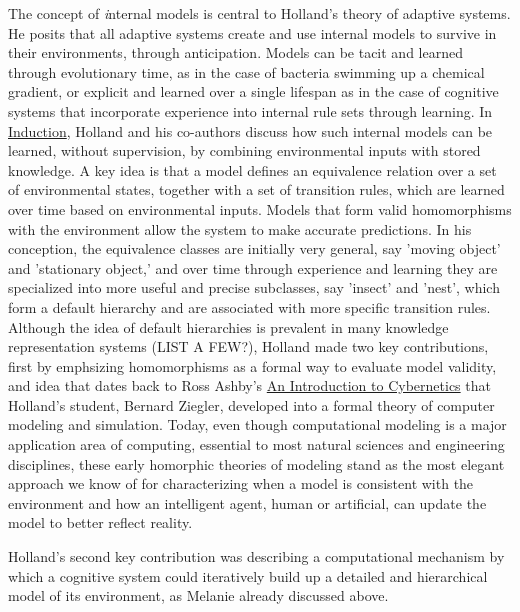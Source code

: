 \documentclass{sig-alternate}
\begin{document}
The concept of {\emph internal models} is central to Holland's theory
of adaptive systems.  He posits that all adaptive systems create and
use internal models to survive in their environments, through
anticipation.  Models can be tacit and learned through evolutionary
time, as in the case of bacteria swimming up a chemical gradient, or
explicit and learned over a single lifespan as in the case of
cognitive systems that incorporate experience into internal rule sets
through learning.  In \underline{Induction}, Holland and his
co-authors discuss how such internal models can be learned, without
supervision, by combining environmental inputs with stored knowledge.
A key idea is that a model defines an equivalence relation over a set
of environmental states, together with a set of transition rules,
which are learned over time based on environmental inputs.  Models
that form valid homomorphisms with the environment allow the system to
make accurate predictions.  In his conception, the equivalence classes
are initially very general, say 'moving object' and 'stationary
object,' and over time through experience and learning they are
specialized into more useful and precise subclasses, say 'insect' and
'nest', which form a default hierarchy and are associated with more
specific transition rules.  Although the idea of default hierarchies
is prevalent in many knowledge representation systems (LIST A FEW?),
Holland made two key contributions, first by emphsizing homomorphisms
as a formal way to evaluate model validity, and idea that dates back
to Ross Ashby's \underline{An Introduction to Cybernetics} that
Holland's student, Bernard Ziegler, developed into a formal theory of
computer modeling and simulation.  Today, even though computational
modeling is a major application area of computing, essential to most
natural sciences and engineering disciplines, these early homorphic
theories of modeling stand as the most elegant approach we know of for
characterizing when a model is consistent with the environment and how
an intelligent agent, human or artificial, can update the model to
better reflect reality.

Holland's second key contribution was describing a computational
mechanism by which a cognitive system could iteratively build up a
detailed and hierarchical model of its environment, as Melanie already
discussed above.
\end{document}
